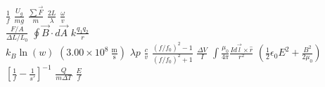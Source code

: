 \documentclass{article}
\begin{document}
\begin{landscape}
\begin{center}
\begin{Large}

$\frac{1}{f}$
$\frac{U_g}{mg}$
$\frac{\sum \vec F}{m}$
$\frac{2L}{\lambda}$
$\frac{\omega}{v}$ \\
\vspace{20pt}
$\frac{F/A}{\Delta L/L_0}$
$\oint \vec B \cdot d\vec A$
$k \frac{q_1 q_2}{r}$ \\
\vspace{20pt}
$k_B \ln(w)$
$(3.00 \times 10^8~\mathrm{\frac m s})$
$\lambda p$
$\frac{c}{v}$
$\frac{(f/f_0)^2 - 1}{(f/f_0)^2 + 1}$
$\frac{\Delta V}{I}$
$\int\frac{\mu_0}{4\pi} \frac{I d\vec l \times \hat r}{r^2}$
$(\frac 1 2 \epsilon_0 E^2 + \frac{B^2}{2\mu_0})$
$\left[ \frac{1}{f} - \frac{1}{s'} \right]^{-1}$
$\frac{Q}{m \Delta T}$
$\frac{E}{f}$

\end{Large}
\end{center}
\end{landscape}
\end{document}
